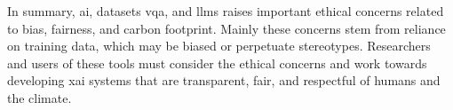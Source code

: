 


\begin{comment}
    Tell how this thesis uses the ethical information above when doing research.
\end{comment}

In summary, \gls{ai}, datasets \gls{vqa}, and \glspl{llm} raises important ethical concerns related to bias, fairness, and carbon footprint. Mainly these concerns stem from reliance on training data, which may be biased or perpetuate stereotypes. 
Researchers and users of these tools must consider the ethical concerns and work towards developing \gls{xai} systems that are transparent, fair, and respectful of humans and the climate.